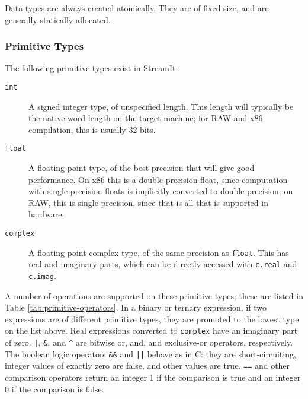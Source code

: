 \documentclass[11pt]{article}
\begin{document}
Data types are always created atomically.  They are of fixed size, and
are generally statically allocated.

\subsubsection{Primitive Types}

The following primitive types exist in StreamIt:

\begin{description}
\item[\lstinline|int|]  A signed integer type, of unspecified length.
  This length will typically be the native word length on the target
  machine; for RAW and x86 compilation, this is usually 32 bits.

\item[\lstinline|float|]  A floating-point type, of the best precision
  that will give good performance.  On x86 this is a double-precision
  float, since computation with single-precision floats is implicitly
  converted to double-precision; on RAW, this is single-precision,
  since that is all that is supported in hardware.

\item[\lstinline|complex|]  A floating-point complex type, of the same
  precision as \lstinline|float|.  This has real and imaginary parts,
  which can be directly accessed with \lstinline|c.real| and
  \lstinline|c.imag|.
\end{description}

\label{sec:operators}
A number of operations are supported on these primitive types; these
are listed in Table \ref{tab:primitive-operators}.  In a binary or
ternary expression, if two expressions are of different primitive
types, they are promoted to the lowest type on the list above.  Real
expressions converted to \lstinline|complex| have an imaginary part of
zero.  \lstinline/|/, \lstinline|&|, and \lstinline|^| are bitwise or,
and, and exclusive-or operators, respectively.  The boolean logic
operators \lstinline|&&| and \lstinline/||/ behave as in C: they are
short-circuiting, integer values of exactly zero are false, and other
values are true.  \lstinline|==| and other comparison operators return
an integer 1 if the comparison is true and an integer 0 if the
comparison is false.
\end{document}
